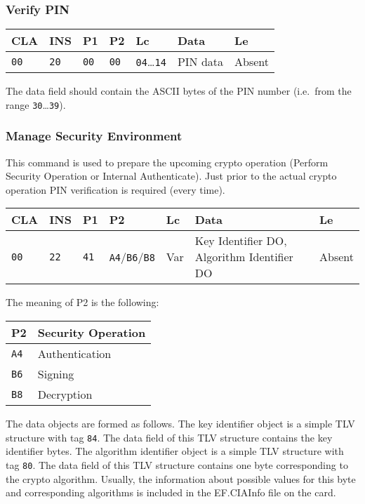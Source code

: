 \documentclass{article}
\begin{document}
\subsubsection{Verify PIN}

\begin{flushleft}
\begin{tabular}{|l|l|l|l|l|l|l|}
\hline
CLA & INS & P1 & P2 & Lc & Data & Le \\
\hline
\texttt{00} & \texttt{20} & \texttt{00} & \texttt{00} &
\texttt{04}\dots\texttt{14} & PIN data & Absent \\
\hline
\end{tabular}
\end{flushleft}
The data field should contain the ASCII bytes of the PIN number
(i.e.\ from the range \texttt{30}\dots\texttt{39}).

\subsubsection{Manage Security Environment}

This command is used to prepare the upcoming crypto operation (Perform
Security Operation or Internal Authenticate). Just prior to the actual
crypto operation PIN verification is required (every time).
\begin{flushleft}
\begin{tabular}{|l|l|l|l|l|l|l|}
\hline
CLA & INS & P1 & P2 & Lc & Data & Le \\
\hline
\texttt{00} & \texttt{22} & \texttt{41} & \texttt{A4}/\texttt{B6}/\texttt{B8} &
Var & Key Identifier DO, Algorithm Identifier DO & Absent \\
\hline
\end{tabular}
\end{flushleft}
The meaning of P2 is the following:
\begin{flushleft}
\begin{tabular}{|l|l|}
\hline
P2 & Security Operation \\
\hline
\texttt{A4} & Authentication \\
\texttt{B6} & Signing \\
\texttt{B8} & Decryption \\
\hline
\end{tabular}
\end{flushleft}
The data objects are formed as follows. The key identifier object is a
simple TLV structure with tag \texttt{84}. The data field of this TLV
structure contains the key identifier bytes.  The algorithm identifier
object is a simple TLV structure with tag \texttt{80}. The data field
of this TLV structure contains one byte corresponding to the crypto
algorithm. Usually, the information about possible values for this
byte and corresponding algorithms is included in the EF.CIAInfo file
on the card.
\end{document}
